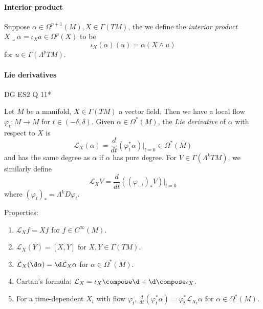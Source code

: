 \documentclass[a4paper]{article}
\newcommand{\w}{\wedge} %
\begin{document}
\paragraph{Interior product}

Suppose \(\alpha \in \Omega^{p + 1}(M), X \in \Gamma(TM)\), the we define the \emph{interior product} \(X \lrcorner \alpha = \iota_X a \in \Omega^p(X)\) to be
\[
  \iota_X(\alpha)(u) = \alpha(X \w u)
\]
for \(u \in \Gamma(\Lambda^pTM)\).

\paragraph{Lie derivatives}

DG ES2 Q 11*

Let \(M\) be a manifold, \(X \in \Gamma(TM)\) a vector field. Then we have a local flow \(\varphi_t: M \to M\) for \(t \in (-\delta, \delta)\). Given \(\alpha \in \Omega^*(M)\), the \emph{Lie derivative} of \(\alpha\) with respect to \(X\) is
\[
  \mathcal L_X(\alpha) = \frac{d}{dt} (\varphi_t^*\alpha)|_{t = 0} \in \Omega^*(M)
\]
and has the same degree as \(\alpha\) if \(\alpha\) has pure degree. For \(V \in \Gamma(\Lambda^kTM)\), we similarly define
\[
  \mathcal L_XV = \frac{d }{d t}((\varphi_{-t})_*V)|_{t = 0}
\]
where \((\varphi_t)_* = \Lambda^k D\varphi_t\).

Properties:
\begin{enumerate}
\item \(\mathcal L_Xf = Xf\) for \(f \in C^\infty(M)\).
\item \(\mathcal L_X(Y) = [X, Y]\) for \(X, Y \in \Gamma(TM)\).
\item \(\mathcal L_X(\d \alpha) = \d \mathcal L_X \alpha\) for \(\alpha \in \Omega^*(M)\).
\item Cartan's formula: \(\mathcal L_X = \iota_X \compose \d + \d \compose \iota_X\).
\item For a time-dependent \(X_t\) with flow \(\varphi_t\), \(\frac{d}{dt}(\varphi_t^*\alpha) = \varphi_t^* \mathcal L_{X_t}\alpha\) for \(\alpha \in \Omega^*(M)\).
\end{enumerate}
\end{document}
